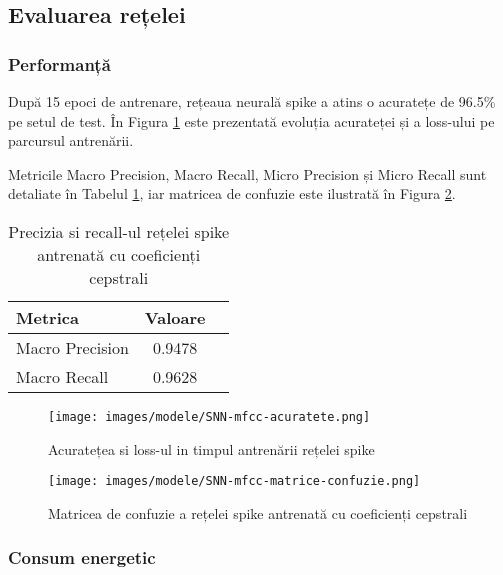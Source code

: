 \subsection{Evaluarea rețelei}

\subsubsection{Performanță}

După 15 epoci de antrenare, rețeaua neurală spike a atins o acuratețe de 96.5\% pe setul de test. În Figura  \ref{fig:acuratete_SNN_mfcc} este prezentată evoluția acurateței și a loss-ului pe parcursul antrenării.

Metricile Macro Precision, Macro Recall, Micro Precision și Micro Recall sunt detaliate în Tabelul \ref{tab:precizie_recall_SNN_mfcc}, iar matricea de confuzie este ilustrată în Figura \ref{fig:matriceConfuzie_SNN_mfcc}.

\begin{table}[h]
    \centering
    \begin{tabular}{lcc}
        \toprule
        \textbf{Metrica} & \textbf{Valoare} \\
        \midrule
        Macro Precision & 0.9478 \\
        Macro Recall    & 0.9628 \\
        \bottomrule
    \end{tabular}
    \caption{Precizia si recall-ul rețelei spike antrenată cu coeficienți cepstrali}
    \label{tab:precizie_recall_SNN_mfcc}
\end{table}

\begin{figure}
    \centering
    \texttt{[image: images/modele/SNN-mfcc-acuratete.png]}
    \caption{Acuratețea si loss-ul in timpul antrenării rețelei spike}
    \label{fig:acuratete_SNN_mfcc}
\end{figure}

\begin{figure}
    \centering
    \texttt{[image: images/modele/SNN-mfcc-matrice-confuzie.png]}
    \caption{Matricea de confuzie a rețelei spike antrenată cu coeficienți cepstrali}
    \label{fig:matriceConfuzie_SNN_mfcc}
\end{figure}

\subsubsection{Consum energetic}

